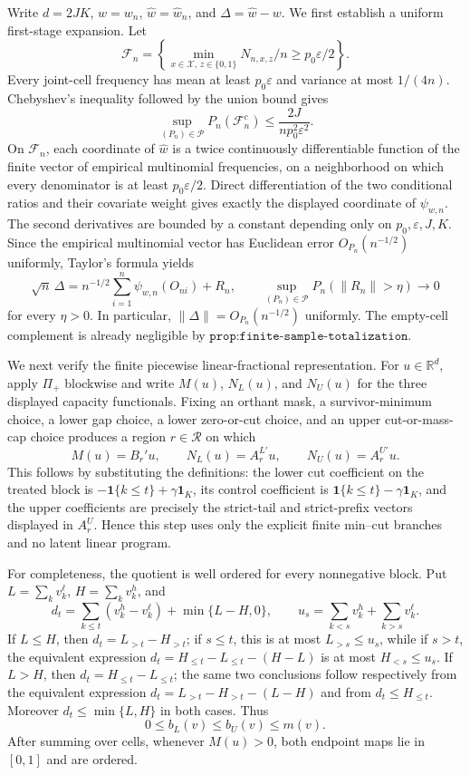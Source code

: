 Write \(d=2JK\), \(w=w_n\), \(\widehat w=\widehat w_n\), and \(\Delta=\widehat w-w\). We first establish a uniform first-stage expansion. Let
\[
 \mathcal F_n=\left\{\min_{x\in\mathcal X,\,z\in\{0,1\}}
                   N_{n,x,z}/n\ge p_0\varepsilon/2\right\}.
\]
Every joint-cell frequency has mean at least \(p_0\varepsilon\) and variance at most \(1/(4n)\). Chebyshev's inequality followed by the union bound gives
\[
 \sup_{(P_n)\in\mathcal P}P_n(\mathcal F_n^c)
 \le \frac{2J}{n p_0^2\varepsilon^2}.
\]
On \(\mathcal F_n\), each coordinate of \(\widehat w\) is a twice continuously differentiable function of the finite vector of empirical multinomial frequencies, on a neighborhood on which every denominator is at least \(p_0\varepsilon/2\). Direct differentiation of the two conditional ratios and their covariate weight gives exactly the displayed coordinate of \(\psi_{w,n}\). The second derivatives are bounded by a constant depending only on \(p_0,\varepsilon,J,K\). Since the empirical multinomial vector has Euclidean error \(O_{P_n}(n^{-1/2})\) uniformly, Taylor's formula yields
\[
 \sqrt n\,\Delta
 =n^{-1/2}\sum_{i=1}^n\psi_{w,n}(O_{ni})+R_n,
 \qquad
 \sup_{(P_n)\in\mathcal P}P_n(\lVert R_n\rVert>\eta)\longrightarrow0
\]
for every \(\eta>0\). In particular, \(\lVert\Delta\rVert=O_{P_n}(n^{-1/2})\) uniformly. The empty-cell complement is already negligible by \(\texttt{prop:finite-sample-totalization}\).

We next verify the finite piecewise linear-fractional representation. For \(u\in\mathbb R^d\), apply \(\Pi_+\) blockwise and write \(M(u)\), \(N_L(u)\), and \(N_U(u)\) for the three displayed capacity functionals. Fixing an orthant mask, a survivor-minimum choice, a lower gap choice, a lower zero-or-cut choice, and an upper cut-or-mass-cap choice produces a region \(r\in\mathcal R\) on which
\[
 M(u)=B_r'u,\qquad N_L(u)=A_r^{L\prime}u,\qquad
 N_U(u)=A_r^{U\prime}u.
\]
This follows by substituting the definitions: the lower cut coefficient on the treated block is
\(-\mathbf1\{k\le t\}+\gamma\mathbf1_K\), its control coefficient is
\(\mathbf1\{k\le t\}-\gamma\mathbf1_K\), and the upper coefficients are precisely the strict-tail and strict-prefix vectors displayed in \(A_r^U\). Hence this step uses only the explicit finite min--cut branches and no latent linear program.

For completeness, the quotient is well ordered for every nonnegative block. Put \(L=\sum_kv_k^\ell\), \(H=\sum_kv_k^h\), and
\[
 d_t=\sum_{k\le t}(v_k^h-v_k^\ell)+\min\{L-H,0\},
 \qquad u_s=\sum_{k<s}v_k^h+\sum_{k>s}v_k^\ell.
\]
If \(L\le H\), then \(d_t=L_{>t}-H_{>t}\); if \(s\le t\), this is at most \(L_{>s}\le u_s\), while if \(s>t\), the equivalent expression
\(d_t=H_{\le t}-L_{\le t}-(H-L)\) is at most \(H_{<s}\le u_s\). If \(L>H\), then \(d_t=H_{\le t}-L_{\le t}\); the same two conclusions follow respectively from the equivalent expression
\(d_t=L_{>t}-H_{>t}-(L-H)\) and from \(d_t\le H_{\le t}\). Moreover \(d_t\le\min\{L,H\}\) in both cases. Thus
\[
 0\le b_L(v)\le b_U(v)\le m(v).
\]
After summing over cells, whenever \(M(u)>0\), both endpoint maps lie in \([0,1]\) and are ordered.

